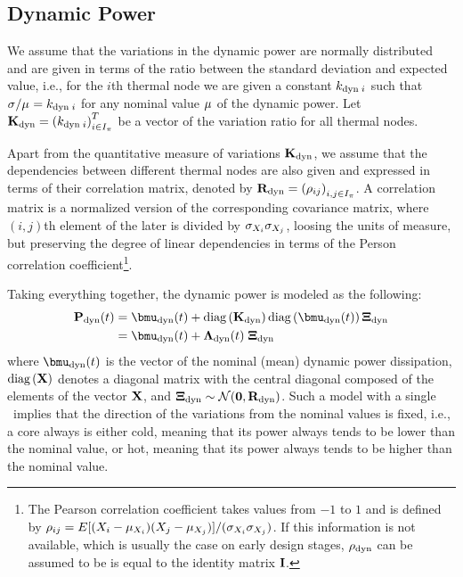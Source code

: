 \subsection{Dynamic Power}
We assume that the variations in the dynamic power are normally distributed and are given in terms of the ratio between the standard deviation and expected value, i.e., for the $i$th thermal node we are given a constant $k_{\text{dyn} \; i}$ such that $\sigma_{}/\mu_{} = k_{\text{dyn} \; i}$ for any nominal value $\mu_{}$ of the dynamic power. Let $\mathbf{K}_{\text{dyn}} = \left(k_{\text{dyn} \; i}\right)^T_{i \in I_\pi}$ be a vector of the variation ratio for all thermal nodes.

Apart from the quantitative measure of variations $\mathbf{K}_{\text{dyn}}$, we assume that the dependencies between different thermal nodes are also given and expressed in terms of their correlation matrix, denoted by $\mathbf{R}_{\text{dyn}} = \left(\rho_{ij}\right)_{i,j \in I_\pi}$. A correlation matrix is a normalized version of the corresponding covariance matrix, where $(i,j)$th element of the later is divided by $\sigma_{X_i} \sigma_{X_j}$, loosing the units of measure, but preserving the degree of linear dependencies in terms of the Person correlation coefficient\footnote{The Pearson correlation coefficient takes values from $-1$ to $1$ and is defined by $\rho_{ij} = E[(X_i - \mu_{X_i})(X_j - \mu_{X_j})]/(\sigma_{X_i}\sigma_{X_j})$. If this information is not available, which is usually the case on early design stages, $\rho_{\text{dyn}}$ can be assumed to be is equal to the identity matrix $\mathbf{I}$.}.

Taking everything together, the dynamic power is modeled as the following:
\begin{align} \equlabel{dynamic-power}
  \vpower_\dyn(\time) & = \vmean{\dyn}(\time) + \diag{\vratio_\dyn} \diag{\vmean{\dyn}(\time)} \vnormal_\dyn \\
  & = \vmean{\dyn}(\time) + \ddeviation{\dyn}(\time) \; \vnormal_\dyn \nonumber
\end{align}
where $\vmean{\dyn}(\time)$ is the vector of the nominal (mean) dynamic power dissipation, $\text{diag}\left(\mathbf{X}\right)$ denotes a diagonal matrix with the central diagonal composed of the elements of the vector $\mathbf{X}$, and $\mathbf{\Xi}_{\text{dyn}} \sim \mathcal{N}(\mathbf{0}, \mathbf{R}_{\text{dyn}})$. Such a model with a single \mrv\ implies that the direction of the variations from the nominal values is fixed, i.e., a core always is either cold, meaning that its power always tends to be lower than the nominal value, or hot, meaning that its power always tends to be higher than the nominal value.

